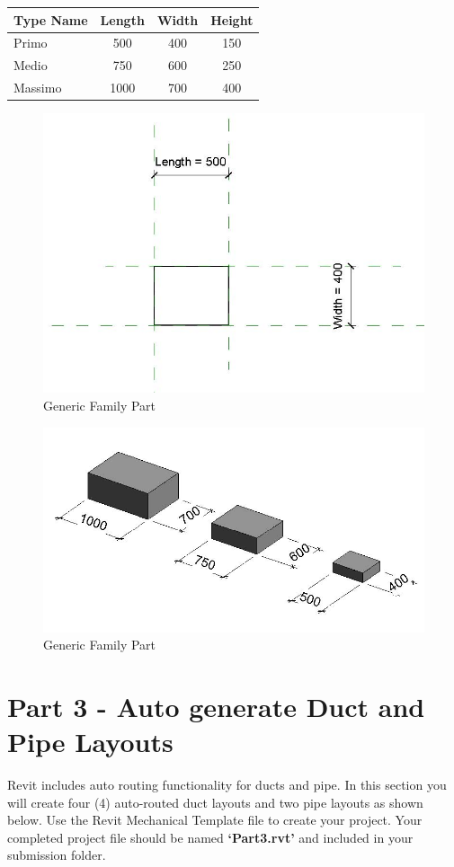 \begin{tabularx}{\textwidth}{ |X|c|c|c| }
	\hline
	\textbf{Type Name} & Length & Width & Height \\
	\hline 
	Primo & 500 & 400 & 150\\
	Medio & 750 & 600 & 250\\
	Massimo & 1000 & 700 & 400\\
	\hline
\end{tabularx}


\begin{figure}[h]
	\centering
	\includegraphics[width=0.7\linewidth]{img/ParaBox1.jpg}
	\caption{Generic Family Part}
	\label{fig:GenericFamilyPart1}
\end{figure}


\begin{figure}[h]
	\centering
	\includegraphics[width=0.7\linewidth]{img/ParaBox2.jpg}
	\caption{Generic Family Part}
	\label{fig:GenericFamilyPart2}
\end{figure}

\newpage

\section*{Part 3 - Auto generate Duct and Pipe Layouts}
Revit includes auto routing functionality for ducts and pipe. In this section you will create four (4) auto-routed duct layouts and two pipe layouts as shown below. Use the Revit Mechanical Template file to create your project. Your completed project file should be named \textbf{‘Part3.rvt’} and included in your submission folder.

